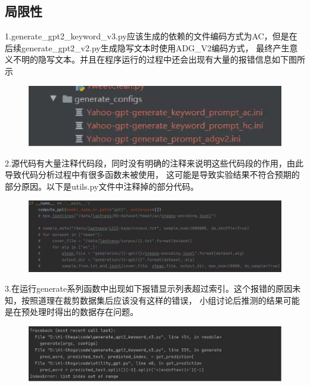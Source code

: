 \documentclass[a4paper,11pt,UTF8]{ctexart}
\newcommand{\bottomcaption}{%
\setlength{\abovecaptionskip}{6pt}%
\setlength{\belowcaptionskip}{6pt}%
\caption}
\newcommand{\xiaowuhao}{\fontsize{9pt}{\baselineskip}\selectfont}   %
\begin{document}
\subsection{局限性}

  1.generate\_gpt2\_keyword\_v3.py应该生成的依赖的文件编码方式为AC，但是在后续generate\_gpt2\_v2.py生成隐写文本时使用ADG\_V2编码方式，
  最终产生意义不明的隐写文本。并且在程序运行的过程中还会出现有大量的报错信息如下图所示
  \begin{figure}[H]
    \centering
    \includegraphics[width=13cm]{报错1.png}
    \bottomcaption{\xiaowuhao{报错信息}}
  \end{figure}\par

  2.源代码有大量注释代码段，同时没有明确的注释来说明这些代码段的作用，由此导致代码分析过程中有很多函数未被使用，
  这可能是导致实验结果不符合预期的部分原因。以下是utils.py文件中注释掉的部分代码。
  \begin{figure}[H]
    \centering
    \includegraphics[width=13cm]{注释代码段.png}
    \bottomcaption{\xiaowuhao{大量注释代码段}}
  \end{figure}\par
  
  3.在运行generate系列函数中出现如下报错显示列表超过索引。这个报错的原因未知，按照道理在裁剪数据集后应该没有这样的错误，
  小组讨论后推测的结果可能是在预处理时得出的数据存在问题。
  \begin{figure}[H]
    \centering
    \includegraphics[width=13cm]{generate报错.png}
    \bottomcaption{\xiaowuhao{generate报错}}
  \end{figure}\par
\end{document}
